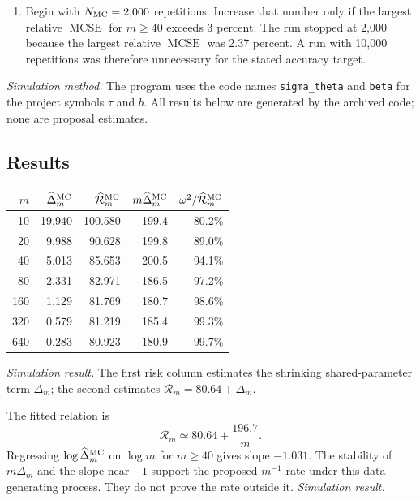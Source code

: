\documentclass[11pt]{article}
\begin{document}
\begin{enumerate}[label=\arabic*.,leftmargin=2.2em]
 \item Begin with \(N_{\rm MC}=2{,}000\) repetitions. Increase that number
 only if the largest relative \(\operatorname{MCSE}\) for \(m\geq40\)
 exceeds 3 percent. The run stopped at 2,000 because the largest relative
 \(\operatorname{MCSE}\) was 2.37 percent. A run with 10,000 repetitions was
 therefore unnecessary for the stated accuracy target.
\end{enumerate}

\noindent\emph{Simulation method.} The program uses the code names
\texttt{sigma\_theta} and \texttt{beta} for the project symbols \(\tau\) and
\(b\). All results below are generated by the archived code; none are
proposal estimates.

\subsection*{Results}

\begin{center}
\begin{tabular}{r r r r r}
\hline
\(m\) & \(\widehat\Delta_m^{\rm MC}\) &
\(\widehat{\mathcal R}_m^{\rm MC}\) &
\(m\widehat\Delta_m^{\rm MC}\) &
\(\omega^2/\widehat{\mathcal R}_m^{\rm MC}\) \\
\hline
10  & 19.940 & 100.580 & 199.4 & 80.2\% \\
20  &  9.988 &  90.628 & 199.8 & 89.0\% \\
40  &  5.013 &  85.653 & 200.5 & 94.1\% \\
80  &  2.331 &  82.971 & 186.5 & 97.2\% \\
160 &  1.129 &  81.769 & 180.7 & 98.6\% \\
320 &  0.579 &  81.219 & 185.4 & 99.3\% \\
640 &  0.283 &  80.923 & 180.9 & 99.7\% \\
\hline
\end{tabular}
\end{center}
\emph{Simulation result.} The first risk column estimates the shrinking
shared-parameter term \(\Delta_m\); the second estimates
\(\mathcal R_m=80.64+\Delta_m\).

The fitted relation is
\begin{equation}
 \mathcal R_m\simeq80.64+\frac{196.7}{m}.
 \label{eq:fitted-mse}
\end{equation}
Regressing \(\log\widehat\Delta_m^{\rm MC}\) on \(\log m\) for
\(m\geq40\) gives slope
\(-1.031\). The stability of \(m\Delta_m\) and the slope near \(-1\)
support the proposed \(m^{-1}\) rate under this data-generating process.
They do not prove the rate outside it. \emph{Simulation result.}
\end{document}
